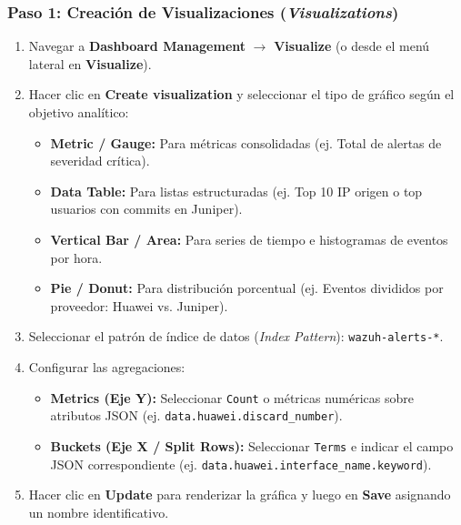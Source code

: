 \subsubsection{Paso 1: Creación de Visualizaciones (\textit{Visualizations})}
\begin{enumerate}
    \item Navegar a \textbf{Dashboard Management} $\rightarrow$ \textbf{Visualize} (o desde el menú lateral en \textbf{Visualize}).
    \item Hacer clic en \textbf{Create visualization} y seleccionar el tipo de gráfico según el objetivo analítico:
    \begin{itemize}
        \item \textbf{Metric / Gauge:} Para métricas consolidadas (ej. Total de alertas de severidad crítica).
        \item \textbf{Data Table:} Para listas estructuradas (ej. Top 10 IP origen o top usuarios con commits en Juniper).
        \item \textbf{Vertical Bar / Area:} Para series de tiempo e histogramas de eventos por hora.
        \item \textbf{Pie / Donut:} Para distribución porcentual (ej. Eventos divididos por proveedor: Huawei vs. Juniper).
    \end{itemize}
    \item Seleccionar el patrón de índice de datos (\textit{Index Pattern}): \texttt{wazuh-alerts-*}.
    \item Configurar las agregaciones:
    \begin{itemize}
        \item \textbf{Metrics (Eje Y):} Seleccionar \texttt{Count} o métricas numéricas sobre atributos JSON (ej. \texttt{data.huawei.discard\_number}).
        \item \textbf{Buckets (Eje X / Split Rows):} Seleccionar \texttt{Terms} e indicar el campo JSON correspondiente (ej. \texttt{data.huawei.interface\_name.keyword}).
    \end{itemize}
    \item Hacer clic en \textbf{Update} para renderizar la gráfica y luego en \textbf{Save} asignando un nombre identificativo.
\end{enumerate}

